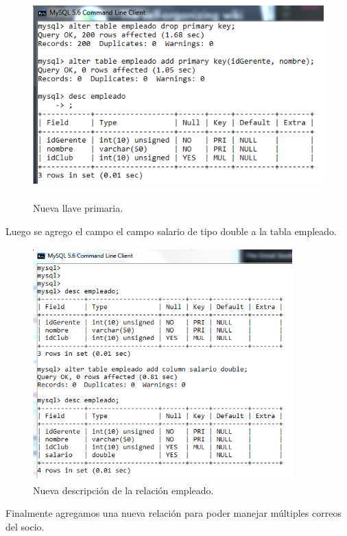\documentclass[12pt, titlepage]{article}
\begin{document}
\begin{figure}[H]
    \begin{center}
        \includegraphics[width=14cm, height=8cm]{img/llave.png}
        \caption{Nueva llave primaria.}
        \label{fig:arlter13}
    \end{center}
\end{figure}
Luego se agrego el campo el campo salario de tipo double a la tabla empleado.
\begin{figure}[H]
    \begin{center}
        \includegraphics[width=10cm, height=9cm]{img/salario.png}
        \caption{Nueva descripción de la relación empleado.}
        \label{fig:arlter14}
    \end{center}
\end{figure}
Finalmente agregamos una nueva relación para poder manejar múltiples correos del socio.
\end{document}

